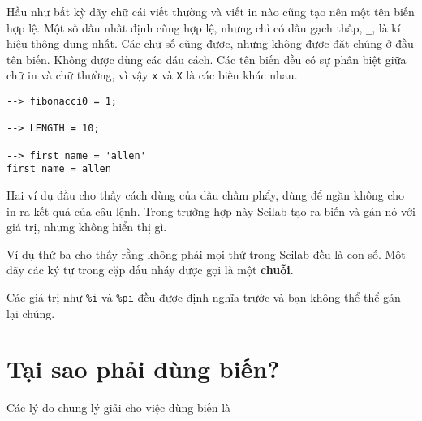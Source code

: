 \documentclass[12pt]{book}
\begin{document}
Hầu như bất kỳ dãy chữ cái viết thường và viết in nào cũng tạo nên
một tên biến hợp lệ. Một số dấu nhất định cũng hợp lệ, nhưng chỉ có
dấu gạch thấp, {\tt \_}, là kí hiệu thông dung nhất. Các chữ số cũng
được, nhưng không được đặt chúng ở đầu tên biến. Không được dùng
các dáu cách. Các tên biến đều có sự phân biệt giữa chữ in và chữ
thường, vì vậy {\tt x} và {\tt X} là các biến khác nhau.

\begin{verbatim}
--> fibonacci0 = 1;

--> LENGTH = 10;

--> first_name = 'allen'
first_name = allen
\end{verbatim}
%
Hai ví dụ đầu cho thấy cách dùng của dấu chấm phẩy, dùng để ngăn
không cho in ra kết quả của câu lệnh. Trong trường hợp này Scilab
tạo ra biến và gán nó với giá trị, nhưng không hiển thị gì.

Ví dụ thứ ba cho thấy rằng không phải mọi thứ trong Scilab đều
là con số. Một dãy các ký tự trong cặp dấu nháy được gọi là
một {\bf chuỗi}.

Các giá trị như {\tt \%i} và {\tt \%pi} đều được định nghĩa trước và
bạn không thể thể gán lại chúng. 

\section{Tại sao phải dùng biến?}

Các lý do chung lý giải cho việc dùng biến là
\end{document}
